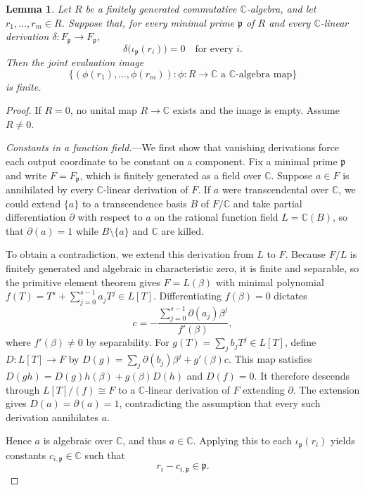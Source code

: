 \documentclass[aps,prl,reprint,longbibliography,nofootinbib,nobibnotes]{revtex4-2}
\newtheorem{lemma}{Lemma}
\begin{document}
\begin{lemma}\label{lem:algebraic-finite-image}
Let $R$ be a finitely generated commutative $\mathbb C$-algebra, and let $r_1,\ldots,r_m\in R$.
Suppose that, for every minimal prime $\mathfrak p$ of $R$ and every $\mathbb C$-linear derivation
$\delta:F_{\mathfrak p}\to F_{\mathfrak p}$,
\[
 \delta\bigl(\iota_{\mathfrak p}(r_i)\bigr)=0
 \quad\text{for every }i.
\]
Then the joint evaluation image
\[
 \{(\phi(r_1),\ldots,\phi(r_m)):
          \phi:R\to\mathbb C\text{ a }\mathbb C\text{-algebra map}\}
\]
is finite.
\end{lemma}

\begin{proof}
If $R=0$, no unital map $R\to\mathbb C$ exists and the image is empty. Assume $R\ne0$.

\emph{Constants in a function field.}---We first show that vanishing derivations force each output
coordinate to be constant on a component. Fix a minimal prime $\mathfrak p$ and write
$F=F_{\mathfrak p}$, which is finitely generated as a field over $\mathbb C$. Suppose $a\in F$ is
annihilated by every $\mathbb C$-linear derivation of $F$. If $a$ were transcendental over $\mathbb
C$, we could extend $\{a\}$ to a transcendence basis $B$ of $F/\mathbb C$ and take partial
differentiation $\partial$ with respect to $a$ on the rational function field $L=\mathbb C(B)$, so
that $\partial(a)=1$ while $B\setminus\{a\}$ and $\mathbb C$ are killed.

To obtain a contradiction, we extend this derivation from $L$ to $F$. Because $F/L$ is finitely
generated and algebraic in characteristic zero, it is finite and separable, so the primitive
element theorem gives $F=L(\beta)$ with minimal polynomial $f(T)=T^s+\sum_{j=0}^{s-1}a_jT^j\in
L[T]$. Differentiating $f(\beta)=0$ dictates
\[
 c=-\frac{\sum_{j=0}^{s-1}\partial(a_j)\beta^j}{f'(\beta)},
\]
where $f'(\beta)\ne 0$ by separability. For $g(T)=\sum_j b_jT^j\in L[T]$, define $D:L[T]\to F$ by
$D(g)=\sum_j\partial(b_j)\beta^j+g'(\beta)c$. This map satisfies $D(gh)=D(g)h(\beta)+g(\beta)D(h)$
and $D(f)=0$. It therefore descends through $L[T]/(f)\cong F$ to a $\mathbb C$-linear derivation of
$F$ extending $\partial$. The extension gives $D(a)=\partial(a)=1$, contradicting the assumption
that every such derivation annihilates $a$.

Hence $a$ is algebraic over $\mathbb C$, and thus $a\in\mathbb C$. Applying this to each
$\iota_{\mathfrak p}(r_i)$ yields constants $c_{i,\mathfrak p}\in\mathbb C$ such that
\begin{equation}\label{eq:component-constants}
 r_i-c_{i,\mathfrak p}\in\mathfrak p.
\end{equation}


\end{proof}
\end{document}
